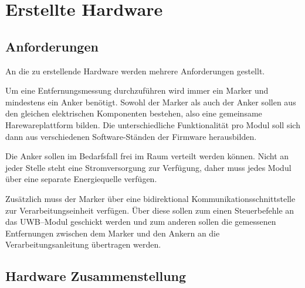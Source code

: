 \begin{comment}
------------------------------------------------------------------------------------------
\end{comment}
\section{Erstellte Hardware}

\begin{comment}
------------------------------------------------------------------------------------------
- Datenübertragung zum Host
- Batteriebetrieb
- TODO: Erweiterbare Hardwareplattform
\end{comment}
\subsection{Anforderungen}

An die zu erstellende Hardware werden mehrere Anforderungen gestellt.

Um eine Entfernungsmessung durchzuführen wird immer ein Marker und mindestens ein Anker benötigt. Sowohl der Marker als auch der Anker sollen aus den gleichen elektrischen Komponenten bestehen, also eine gemeinsame Harewareplattform bilden. Die unterschiedliche Funktionalität pro Modul soll sich dann aus verschiedenen Software-Ständen der Firmware herausbilden.

Die Anker sollen im Bedarfsfall frei im Raum verteilt werden können. Nicht an jeder Stelle steht eine Stromversorgung zur Verfügung, daher muss jedes Modul über eine separate Energiequelle verfügen.

Zusätzlich muss der Marker über eine bidirektional Kommunikationsschnittstelle zur Verarbeitungseinheit verfügen. Über diese sollen zum einen Steuerbefehle an das UWB--Modul geschickt werden und zum anderen sollen die gemessenen Entfernungen zwischen dem Marker und den Ankern an die Verarbeitungsanleitung übertragen werden.


\begin{comment}
------------------------------------------------------------------------------------------
- Zusätzlich werden Erfahrungsberichte aus dem Internet ausgewertet um die Beschaltung weiter zu verfeinern, siehe \cite{Trojer2015, Holder2016, Holder2016a}.
\end{comment}
\subsection{Hardware Zusammenstellung}


